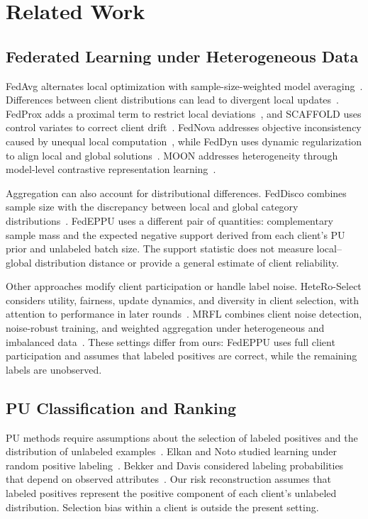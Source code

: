 \documentclass[lettersize,journal]{IEEEtran}
\begin{document}
\section{Related Work}

\subsection{Federated Learning under Heterogeneous Data}

FedAvg alternates local optimization with sample-size-weighted model averaging~\cite{ref_fedavg}. Differences between client distributions can lead to divergent local updates~\cite{ref_fl_survey}. FedProx adds a proximal term to restrict local deviations~\cite{ref_fedprox}, and SCAFFOLD uses control variates to correct client drift~\cite{ref_scaffold}. FedNova addresses objective inconsistency caused by unequal local computation~\cite{ref_fednova}, while FedDyn uses dynamic regularization to align local and global solutions~\cite{ref_feddyn}. MOON addresses heterogeneity through model-level contrastive representation learning~\cite{ref_moon}.

Aggregation can also account for distributional differences. FedDisco combines sample size with the discrepancy between local and global category distributions~\cite{ref_feddisco}. FedEPPU uses a different pair of quantities: complementary sample mass and the expected negative support derived from each client's PU prior and unlabeled batch size. The support statistic does not measure local--global distribution distance or provide a general estimate of client reliability.

Other approaches modify client participation or handle label noise. HeteRo-Select considers utility, fairness, update dynamics, and diversity in client selection, with attention to performance in later rounds~\cite{ref_heteroselect}. MRFL combines client noise detection, noise-robust training, and weighted aggregation under heterogeneous and imbalanced data~\cite{ref_mrfl}. These settings differ from ours: FedEPPU uses full client participation and assumes that labeled positives are correct, while the remaining labels are unobserved.

\subsection{PU Classification and Ranking}

PU methods require assumptions about the selection of labeled positives and the distribution of unlabeled examples~\cite{ref_pu_survey}. Elkan and Noto studied learning under random positive labeling~\cite{ref_elkan}. Bekker and Davis considered labeling probabilities that depend on observed attributes~\cite{ref_sar}. Our risk reconstruction assumes that labeled positives represent the positive component of each client's unlabeled distribution. Selection bias within a client is outside the present setting.
\end{document}
